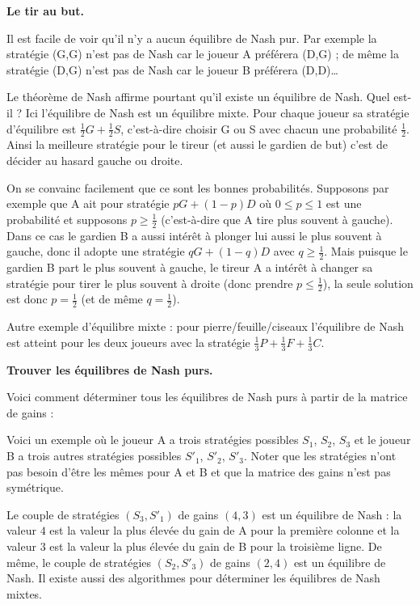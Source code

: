 \documentclass[11pt,class=report,crop=false]{standalone}
\begin{document}
\bigskip
\textbf{Le tir au but.}




Il est facile de voir qu'il n'y a aucun équilibre de Nash pur. Par exemple la stratégie (G,G) n'est pas de Nash car le joueur A préférera (D,G) ; de même la stratégie (D,G) n'est pas de Nash car le joueur B préférera (D,D)\ldots

Le théorème de Nash affirme pourtant qu'il existe un équilibre de Nash. Quel est-il ? 
Ici l'équilibre de Nash est un équilibre mixte. Pour chaque joueur sa stratégie d'équilibre est $\frac12G+ \frac12S$, c'est-à-dire choisir G ou S avec chacun une probabilité $\frac12$. Ainsi la meilleure stratégie pour le tireur (et aussi le gardien de but) c'est de décider au hasard gauche ou droite.

On se convainc facilement que ce sont les bonnes probabilités. Supposons par exemple que A ait pour stratégie $pG + (1-p)D$ où $0 \le p \le 1$ est une probabilité
et supposons $p \ge \frac12$ (c'est-à-dire que A tire plus souvent à gauche). Dans ce cas le gardien B a aussi intérêt à plonger lui aussi le plus souvent à gauche, donc il adopte une stratégie $qG+(1-q)D$ avec $q \ge \frac12$. Mais puisque le gardien B part le plus souvent à gauche, le tireur A a intérêt à changer sa stratégie pour tirer le plus souvent à droite (donc prendre $p \le \frac12$), la seule solution est donc $p = \frac12$ (et de même $q=\frac12$).


Autre exemple d'équilibre mixte : pour \og{}pierre/feuille/ciseaux\fg{} l'équilibre de Nash est atteint pour les deux joueurs avec la stratégie $\frac13P+\frac13F+\frac13C$.



\bigskip
\textbf{Trouver les équilibres de Nash purs.}

Voici comment déterminer tous les équilibres de Nash purs à partir de la matrice de gains :




Voici un exemple où le joueur A a trois stratégies possibles $S_1$, $S_2$, $S_3$ et le joueur B a trois autres stratégies possibles $S'_1$, $S'_2$, $S'_3$. Noter que les stratégies n'ont pas besoin d'être les mêmes pour A et B et que la matrice des gains n'est pas symétrique. 


Le couple de stratégies $(S_3,S'_1)$ de gains $(4,3)$ est un équilibre de Nash : la valeur $4$ est la valeur la plus élevée du gain de A pour la première colonne et la valeur $3$ est la valeur  la plus élevée du gain de B pour la troisième ligne.
De même, le couple de stratégies $(S_2,S'_3)$ de gains $(2,4)$ est un équilibre de Nash.
Il existe aussi des algorithmes pour déterminer les équilibres de Nash mixtes.
\end{document}
